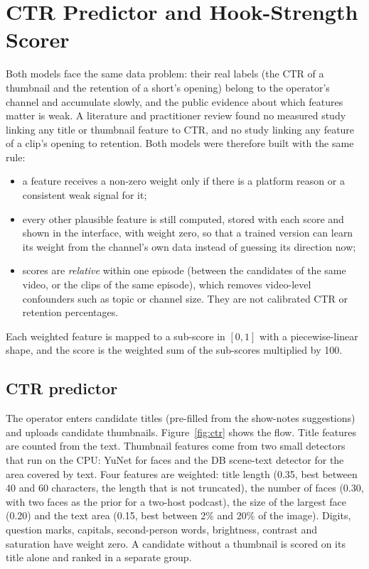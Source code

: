 \section{CTR Predictor and Hook-Strength Scorer}
\label{s:ctrhook}

Both models face the same data problem: their real labels (the CTR of a thumbnail and the retention of a short's opening) belong to the operator's channel and accumulate slowly, and the public evidence about which features matter is weak. A literature and practitioner review found no measured study linking any title or thumbnail feature to CTR, and no study linking any feature of a clip's opening to retention. Both models were therefore built with the same rule:
\begin{itemize}
\item a feature receives a non-zero weight only if there is a platform reason or a consistent weak signal for it;
\item every other plausible feature is still computed, stored with each score and shown in the interface, with weight zero, so that a trained version can learn its weight from the channel's own data instead of guessing its direction now;
\item scores are \textit{relative} within one episode (between the candidates of the same video, or the clips of the same episode), which removes video-level confounders such as topic or channel size. They are not calibrated CTR or retention percentages.
\end{itemize}
Each weighted feature is mapped to a sub-score in $[0,1]$ with a piecewise-linear shape, and the score is the weighted sum of the sub-scores multiplied by 100.

\subsection*{CTR predictor}

The operator enters candidate titles (pre-filled from the show-notes suggestions) and uploads candidate thumbnails. Figure~\ref{fig:ctr} shows the flow. Title features are counted from the text. Thumbnail features come from two small detectors that run on the CPU: YuNet \cite{wu2023yunet} for faces and the DB scene-text detector \cite{liao2020db} for the area covered by text. Four features are weighted: title length (0.35, best between 40 and 60 characters, the length that is not truncated), the number of faces (0.30, with two faces as the prior for a two-host podcast), the size of the largest face (0.20) and the text area (0.15, best between 2\% and 20\% of the image). Digits, question marks, capitals, second-person words, brightness, contrast and saturation have weight zero. A candidate without a thumbnail is scored on its title alone and ranked in a separate group.

